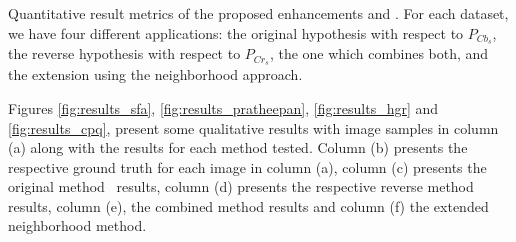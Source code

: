 \begin{table}[ht]
\caption[Quantitative result metrics of the proposed enhancements and \citet{brancati:17}]{Quantitative result metrics of the proposed enhancements and \citet{brancati:17}. For each dataset, we have four different applications: the original hypothesis with respect to $P_{Cb_{s}}$, the reverse hypothesis with respect to $P_{Cr_{s}}$, the one which combines both, and the extension using the neighborhood approach.}
\label{tab:merged_rules_results}

\end{table}


Figures \ref{fig:results_sfa}, \ref{fig:results_pratheepan}, \ref{fig:results_hgr} and \ref{fig:results_cpq}, present some qualitative results with image samples in column (a) along with the results for each method tested. Column (b) presents the respective ground truth for each image in column (a), column (c) presents the original method~\cite{brancati:17} results, column (d) presents the respective reverse method results, column (e), the combined method results and column (f) the extended neighborhood method.


